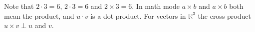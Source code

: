 Note that $2 \cdot 3 = 6$, $2 \cdot 3 = 6$ and $2 \times 3 = 6$.
In math mode $a \times b$ and $a \times b$ both mean the product, and $u \cdot v$ is a dot product.
For vectors in $\mathbb{R}^{3}$ the cross product $u \times v \perp u$ and $v$.